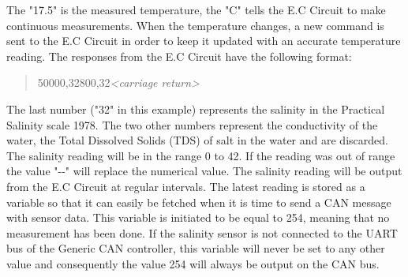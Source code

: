 The "17.5" is the measured temperature, the "C" tells the E.C Circuit to make continuous measurements. When the temperature changes, a new command is sent to the E.C Circuit in order to keep it updated with an accurate temperature reading. \newline
The responses from the E.C Circuit have the following format:

\begin{quote}
50000,32800,32\emph{<carriage return>}
\end{quote}

The last number ("32" in this example) represents the salinity in the Practical Salinity scale 1978. The two other numbers represent the conductivity of the water, the Total Dissolved Solids (TDS) of salt in the water and are discarded. The salinity reading will be in the range 0 to 42. If the reading was out of range the value "\--\--" will replace the numerical value. \newline
The salinity reading will be output from the E.C Circuit at regular intervals. The latest reading is stored as a variable so that it can easily be fetched when it is time to send a CAN message with sensor data. This variable is initiated to be equal to 254, meaning that no measurement has been done. If the salinity sensor is not connected to the UART bus of the Generic CAN controller, this variable will never be set to any other value and consequently the value 254 will always be output on the CAN bus.


